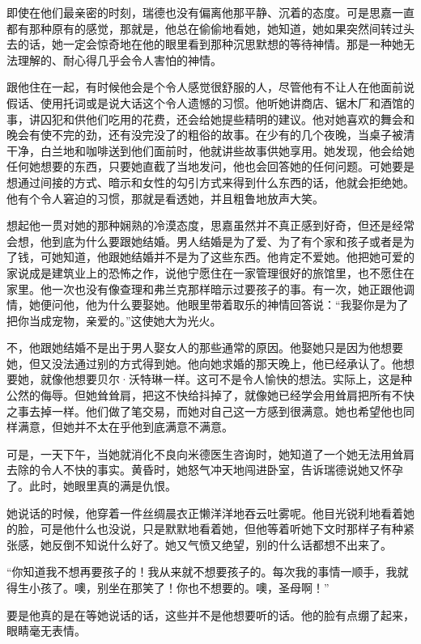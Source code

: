 \par 即使在他们最亲密的时刻，瑞德也没有偏离他那平静、沉着的态度。可是思嘉一直都有那种原有的感觉，那就是，他总在偷偷地看她，她知道，她如果突然间转过头去的话，她一定会惊奇地在他的眼里看到那种沉思默想的等待神情。那是一种她无法理解的、耐心得几乎会令人害怕的神情。
\par 跟他住在一起，有时候他会是个令人感觉很舒服的人，尽管他有不让人在他面前说假话、使用托词或是说大话这个令人遗憾的习惯。他听她讲商店、锯木厂和酒馆的事，讲囚犯和供他们吃用的花费，还会给她提些精明的建议。他对她喜欢的舞会和晚会有使不完的劲，还有没完没了的粗俗的故事。在少有的几个夜晚，当桌子被清干净，白兰地和咖啡送到他们面前时，他就讲些故事供她享用。她发现，他会给她任何她想要的东西，只要她直截了当地发问，他也会回答她的任何问题。可她要是想通过间接的方式、暗示和女性的勾引方式来得到什么东西的话，他就会拒绝她。他有个令人窘迫的习惯，那就是看透她，并且粗鲁地放声大笑。
\par 想起他一贯对她的那种娴熟的冷漠态度，思嘉虽然并不真正感到好奇，但还是经常会想，他到底为什么要跟她结婚。男人结婚是为了爱、为了有个家和孩子或者是为了钱，可她知道，他跟她结婚并不是为了这些东西。他肯定不爱她。他把她可爱的家说成是建筑业上的恐怖之作，说他宁愿住在一家管理很好的旅馆里，也不愿住在家里。他一次也没有像查理和弗兰克那样暗示过要孩子的事。有一次，她正跟他调情，她便问他，他为什么要娶她。他眼里带着取乐的神情回答说：“我娶你是为了把你当成宠物，亲爱的。”这使她大为光火。
\par 不，他跟她结婚不是出于男人娶女人的那些通常的原因。他娶她只是因为他想要她，但又没法通过别的方式得到她。他向她求婚的那天晚上，他已经承认了。他想要她，就像他想要贝尔·沃特琳一样。这可不是令人愉快的想法。实际上，这是种公然的侮辱。但她耸耸肩，把这不快给抖掉了，就像她已经学会用耸肩把所有不快之事去掉一样。他们做了笔交易，而她对自己这一方感到很满意。她也希望他也同样满意，但她并不太在乎他到底满意不满意。
\par 可是，一天下午，当她就消化不良向米德医生咨询时，她知道了一个她无法用耸肩去除的令人不快的事实。黄昏时，她怒气冲天地闯进卧室，告诉瑞德说她又怀孕了。此时，她眼里真的满是仇恨。
\par 她说话的时候，他穿着一件丝绸晨衣正懒洋洋地吞云吐雾呢。他目光锐利地看着她的脸，可是他什么也没说，只是默默地看着她，但他等着听她下文时那样子有种紧张感，她反倒不知说什么好了。她又气愤又绝望，别的什么话都想不出来了。
\par “你知道我不想再要孩子的！我从来就不想要孩子的。每次我的事情一顺手，我就得生小孩了。噢，别坐在那笑了！你也不想要的。噢，圣母啊！”
\par 要是他真的是在等她说话的话，这些并不是他想要听的话。他的脸有点绷了起来，眼睛毫无表情。
